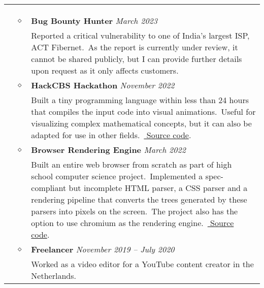 \documentclass[11pt]{article}
\begin{document}
    \noindent
    \begin{tabularx}{\textwidth}{@{}b{90px} b{9px}@{} X@{}}
        \iftoggle{lines}{\\ \\ \hline \\}{}

        \lettrine[lines=1,loversize=-0.5]{E}XPERIENCE & $\diamond$ &

        \textbf{Bug Bounty Hunter} \hfill \textit{March 2023} \\ & &
        Reported a critical vulnerability to one of India's largest ISP, ACT Fibernet.\ As the report is currently
        under review, it cannot be shared publicly, but I can provide further details upon request as it only affects
        customers.

        \\ & $\diamond$ &

        \textbf{HackCBS Hackathon} \hfill \textit{November 2022} \\ & &
        Built a tiny programming language within less than 24 hours that compiles the input code into visual
        animations.\ Useful for visualizing complex mathematical concepts, but it can also be adapted for use in
        other fields.\ \href{https://github.com/sujaldev/lyn}{\color{blue} Source code}.\

        \\ & $\diamond$ &

        \textbf{Browser Rendering Engine} \hfill \textit{March 2022} \\ & &
        Built an entire web browser from scratch as part of high school computer science project.\ Implemented a
        spec-compliant but incomplete HTML parser, a CSS parser and a rendering pipeline that converts the trees
        generated by these parsers into pixels on the screen.\ The project also has the option to use chromium as the
        rendering engine.\ \href{https://github.com/sujaldev/skylon}{\color{blue} Source code}.\

        \\ & $\diamond$ &

        \textbf{Freelancer} \hfill \textit{November 2019 -- July 2020} \\ & &
        Worked as a video editor for a YouTube content creator in the Netherlands.


\end{tabularx}
\end{document}
